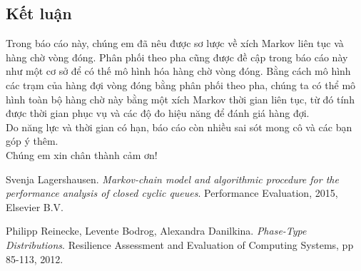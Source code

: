 \documentclass[13pt, oneside, a4paper, openany]{article}
\begin{document}
\begin{Large}
\section{Kết luận}
Trong báo cáo này, chúng em đã nêu được sơ lược về xích Markov liên tục và hàng chờ vòng đóng. Phân phối theo pha cũng được đề cập trong báo cáo này như một cơ sở để có thế mô hình hóa hàng chờ vòng đóng. Bằng cách mô hình các trạm của hàng đợi vòng đóng bằng phân phối theo pha, chúng ta có thể mô hình toàn bộ hàng chờ này bằng một xích Markov thời gian liên tục, từ đó tính được thời gian phục vụ và các độ đo hiệu năng để đánh giá hàng đợi.\\
Do năng lực và thời gian có hạn, báo cáo còn nhiều sai sót mong cô và các bạn góp ý thêm.\\
Chúng em xin chân thành cảm ơn!
\newpage
\begin{thebibliography}{9}
	Svenja Lagershausen. 
	\textit{Markov-chain model and algorithmic procedure for the performance analysis of closed cyclic queues}. 
	Performance Evaluation, 2015, Elsevier B.V.
	
	Philipp Reinecke, Levente Bodrog, Alexandra Danilkina.
	\textit{Phase-Type Distributions}. 
	Resilience Assessment and Evaluation of Computing Systems, pp 85-113, 2012.
\end{thebibliography}
\end{Large}
\end{document}
